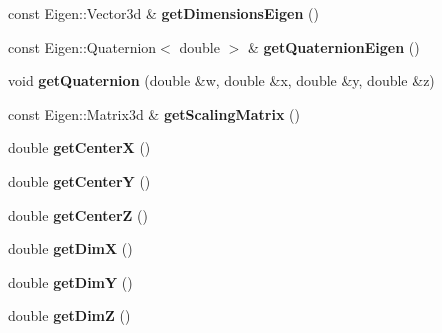 \begin{DoxyCompactItemize}
\item 
\hypertarget{classhiqp_1_1GeometricBox_a47a2ff0a4cb9f9983e215119779fccc1}{const Eigen\-::\-Vector3d \& {\bfseries get\-Dimensions\-Eigen} ()}\label{classhiqp_1_1GeometricBox_a47a2ff0a4cb9f9983e215119779fccc1}

\item 
\hypertarget{classhiqp_1_1GeometricBox_aa770212d8c68dbb8c828220887365304}{const Eigen\-::\-Quaternion$<$ double $>$ \& {\bfseries get\-Quaternion\-Eigen} ()}\label{classhiqp_1_1GeometricBox_aa770212d8c68dbb8c828220887365304}

\item 
\hypertarget{classhiqp_1_1GeometricBox_a84af1420196bca8b32a370f9dbd9b5fc}{void {\bfseries get\-Quaternion} (double \&w, double \&x, double \&y, double \&z)}\label{classhiqp_1_1GeometricBox_a84af1420196bca8b32a370f9dbd9b5fc}

\item 
\hypertarget{classhiqp_1_1GeometricBox_a0b1f06f710cee41c4f160fd560867afb}{const Eigen\-::\-Matrix3d \& {\bfseries get\-Scaling\-Matrix} ()}\label{classhiqp_1_1GeometricBox_a0b1f06f710cee41c4f160fd560867afb}

\item 
\hypertarget{classhiqp_1_1GeometricBox_ae2399ec17d71ea743c019ae2b83a16ab}{double {\bfseries get\-Center\-X} ()}\label{classhiqp_1_1GeometricBox_ae2399ec17d71ea743c019ae2b83a16ab}

\item 
\hypertarget{classhiqp_1_1GeometricBox_ad62797a00a42c92448f36a897f2cfb0c}{double {\bfseries get\-Center\-Y} ()}\label{classhiqp_1_1GeometricBox_ad62797a00a42c92448f36a897f2cfb0c}

\item 
\hypertarget{classhiqp_1_1GeometricBox_aaf6b615c9013e09d7819b96c94a6dce1}{double {\bfseries get\-Center\-Z} ()}\label{classhiqp_1_1GeometricBox_aaf6b615c9013e09d7819b96c94a6dce1}

\item 
\hypertarget{classhiqp_1_1GeometricBox_a06353e203dd215135234a356ebd3fe74}{double {\bfseries get\-Dim\-X} ()}\label{classhiqp_1_1GeometricBox_a06353e203dd215135234a356ebd3fe74}

\item 
\hypertarget{classhiqp_1_1GeometricBox_a7f9309d6a2f7c19eb69b57bd1e579b29}{double {\bfseries get\-Dim\-Y} ()}\label{classhiqp_1_1GeometricBox_a7f9309d6a2f7c19eb69b57bd1e579b29}

\item 
\hypertarget{classhiqp_1_1GeometricBox_ab180c8709df2211e585e0e91304bef1e}{double {\bfseries get\-Dim\-Z} ()}\label{classhiqp_1_1GeometricBox_ab180c8709df2211e585e0e91304bef1e}

\end{DoxyCompactItemize}
